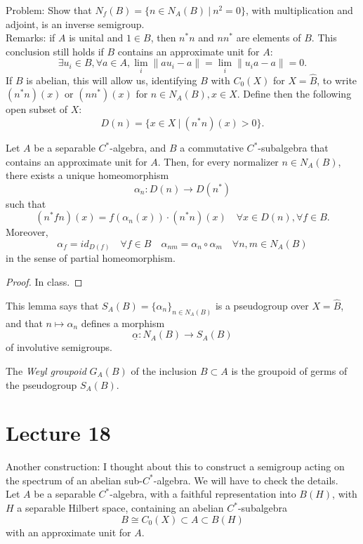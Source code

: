 Problem: Show that $N_f(B) = \{n \in N_A(B)\ | \ n^2 = 0\}$, with multiplication and adjoint, is an inverse semigroup.\\

Remarks: if $A$ is unital and $1\in B$, then $n^*n$ and $nn^*$ are elements of $B$. This conclusion still holds if $B$ contains an approximate unit for $A$: 
\[\exists u_i\in B , \forall a\in A, \lim_i\|au_i -a \| =\lim_i\|u_ia-a \| =0 .\]
If $B$ is abelian, this will allow us, identifying $B$ with $C_0(X)$ for $X=\hat B$, to write $(n^*n)(x)$ or $(nn^*)(x)$ for $n\in N_A(B), x\in X$. Define then the following open subset of $X$:
\[D(n)=\{x \in X \ | \ (n^*n)(x) > 0\}.\]

\begin{lem}[Kumijan, 1986]
Let $A$ be a separable $C^*$-algebra, and $B$ a commutative $C^*$-subalgebra that contains an approximate unit for $A$. Then, for every normalizer $n\in N_A(B)$, there exists a unique homeomorphism 
\[\alpha_n :  D(n) \rightarrow D(n^*)\]
such that \[(n^*fn)(x) = f(\alpha_n(x))\cdot (n^*n)(x) \quad \forall x \in D(n),\forall f\in B. \] 
Moreover,\[\alpha_f = id_{D(f)}\quad \forall f\in B \quad \alpha_{nm} = \alpha_n \circ \alpha_m \quad\forall n,m \in N_A(B)\]
in the sense of partial homeomorphism. 
\end{lem}

\begin{proof} In class. \end{proof}

This lemma says that $S_A(B) =\{\alpha_n\}_{n\in N_A(B)}$ is a pseudogroup over $X=\hat B$, and that $n \mapsto \alpha_n$ defines a morphism
\[\underline \alpha : N_A(B) \rightarrow S_A(B)\]
of involutive semigroups.

\begin{definition}
The \textit{Weyl groupoid} $G_A(B)$ of the inclusion $B\subset A$ is the groupoid of germs of the pseudogroup $S_A(B)$. 
\end{definition}


\section{Lecture 18}

Another construction: I thought about this to construct a semigroup acting on the spectrum of an abelian sub-$C^*$-algebra. We will have to check the details.\\

Let $A$ be a separable $C^*$-algebra, with a faithful representation into $B(H)$, with $H$ a separable Hilbert space, containing an abelian $C^*$-subalgebra
\[B \cong C_0(X) \subset A \subset B(H)\]
with an approximate unit for $A$.\\

